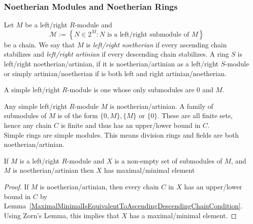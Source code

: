 \subsubsection{Noetherian Modules and Noetherian Rings}
\begin{definition}\label{NoetherianArtinianDef}
    Let $M$ be a left/right $R$-module and 
    $$\mathcal{M} := \left\{ N\in 2^M : N \text{ is a left/right submodule of } M \right\}$$
    be a chain. We say that $M$ is \textit{left/right noetherian} if every ascending chain stabilizes and \textit{left/right artinian} if every descending chain stabilizes. A ring $S$ is left/right noetherian/artinian, if it is noetherian/artinian as a left/right $S$-module or simply artinian/noetherian if is both left and right artinian/noetherian.  
\end{definition}
\begin{definition}
    A simple left/right $R$-module is one whose only submodules are $0$ and $M$.
\end{definition}
\begin{example}
    Any simple left/right $R$-module $M$ is noetherian/artinian. A family of submodules of $M$ is of the form $\{0,M\},\{M\}$ or $\{0\}$. These are all finite sets, hence any chain $C$ is finite and thus has an upper/lower bound in $C$.\\
    Simple rings are simple modules. This means division rings and fields are both noetherian/artinian.
\end{example}

\begin{proposition}\label{NoetherianRespArtinianImpliesMaximalMinimalElement}
    If $M$ is a left/right $R$-module and $X$ is a non-empty set of submodules of $M$, and $M$ is noetherian/artinian then $X$ has maximal/minimal element
\end{proposition}
\begin{proof}
    If $M$ is noetherian/artinian, then every chain $C$ in $X$ has an upper/lower bound in $C$ by Lemma~\ref{MaximalMinimalIsEquivalentToAscendingDescendingChainCondition}. Using Zorn's Lemma, this implies that $X$ has a maximal/minimal element.  
\end{proof}

